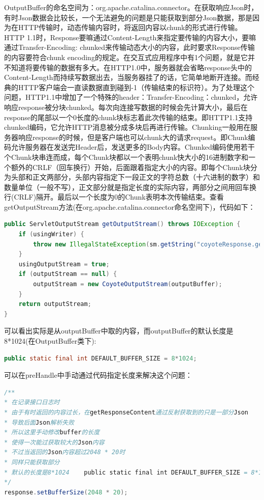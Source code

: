 \documentclass[12pt]{book}
\numberwithin{dummy}{section}
\theoremstyle{ocrenumbox}
\theoremstyle{blacknumex}
\theoremstyle{blacknumbox}
\theoremstyle{ocrenum}
\newlength\esp
\begin{document}
OutputBuffer的命名空间为：org.apache.catalina.connector。在获取响应Json时，有时Json数据会比较长，一个无法避免的问题是只能获取到部分Json数据，那是因为在HTTP传输时，动态传输内容时，将返回内容以chunk的形式进行传输。HTTP 1.1时，Response要嘛通过Content-Length来指定要传输的内容大小，要嘛通过Transfer-Encoding: chunked来传输动态大小的内容，此时要求Response传输的内容要符合chunk encoding的规定。在交互式应用程序中有1个问题，就是它并不知道将要传输的数据有多大。在HTTP1.0中，服务器就会省略response头中的Content-Length而持续写数据出去，当服务器挂了的话，它简单地断开连接。而经典的HTTP客户端会一直读数据直到碰到-1（传输结束的标识符）。为了处理这个问题，HTTP1.1中增加了一个特殊的header：Transfer-Encoding：chunked，允许响应response被分块chunked。每次向连接写数据的时候会先计算大小，最后在response的尾部以一个0长度的chunk块标志着此次传输的结束。即HTTP1.1支持chunked编码，它允许HTTP消息被分成多块后再进行传输。Chunking一般用在服务器响应response的时候，但是客户端也可以chunk大的请求request。即Chunk编码允许服务器在发送完Header后，发送更多的Body内容。Chunked编码使用若干个Chunk块串连而成，每个Chunk块都以一个表明chunk快大小的16进制数字和一个额外的CRLF（回车换行）开始，后面跟着指定大小的内容。即每个Chunk块分为头部和正文两部分，头部内容指定下一段正文的字符总数（十六进制的数字）和数量单位（一般不写），正文部分就是指定长度的实际内容，两部分之间用回车换行(CRLF)隔开。最后以一个长度为0的Chunk表明本次传输结束。查看getOutputStream方法(在org.apache.catalina.connector命名空间下)，代码如下：

\begin{lstlisting}[language=Java]
public ServletOutputStream getOutputStream() throws IOException {
	if (usingWriter) {
		throw new IllegalStateException(sm.getString("coyoteResponse.getOutputStream.ise"));
	}
	usingOutputStream = true;
	if (outputStream == null) {
		outputStream = new CoyoteOutputStream(outputBuffer);
	}
	return outputStream;
}
\end{lstlisting}

可以看出实际是从outputBuffer中取的内容，而outputBuffer的默认长度是8*1024(在OutputBuffer类下):

\begin{lstlisting}[language=Java]
public static final int DEFAULT_BUFFER_SIZE = 8*1024;
\end{lstlisting}

可以在preHandle中手动通过代码指定长度来解决这个问题：

\begin{lstlisting}[language=Java]
/**
* 在记录接口日志时
* 由于有时返回的内容过长，在getResponseContent通过反射获取到的只是一部分Json
* 导致后面Json解析失败
* 所以这里手动修改buffer的长度
* 使得一次能过获取较大的Json内容
* 不过当返回的Json内容超过2048 * 20时
* 同样只能获取部分
* 默认的长度是8*1024    public static final int DEFAULT_BUFFER_SIZE = 8*1024;
*/
response.setBufferSize(2048 * 20);
\end{lstlisting}
\end{document}
